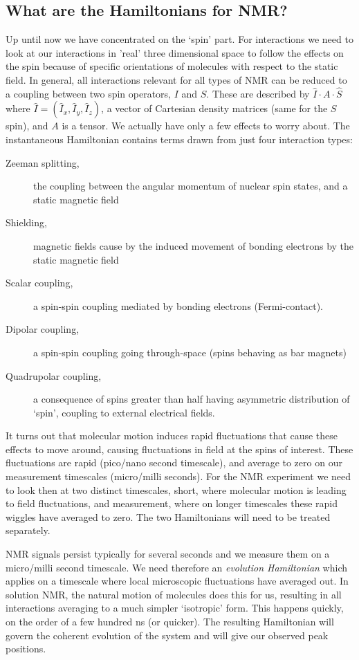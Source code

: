 \documentclass[notitlepage,11pt]{article}
\begin{document}
\subsection{What are the Hamiltonians for NMR?}

Up until now we have concentrated on the `spin' part. For interactions we need to look at our interactions in 'real' three dimensional space to follow the effects on the spin because of specific orientations of molecules with respect to the static field. In general, all interactions relevant for all types of NMR can be reduced to a coupling between two spin operators, $I$ and $S$. These are described by $\hat{I} \cdot A \cdot \hat{S}$ where $\hat{I}=(\hat{I}_x,\hat{I}_y,\hat{I}_z)$, a vector of Cartesian density matrices (same for the $S$ spin), and $A$ is a tensor. We actually have only a few effects to worry about. The instantaneous Hamiltonian contains terms drawn from just four interaction types:

\begin{description}
\item [Zeeman splitting,] the coupling between the angular momentum of nuclear spin states, and a static magnetic field
  \item [Shielding,] magnetic fields cause by the induced movement of bonding electrons by the static magnetic field
\item [Scalar coupling,] a spin-spin coupling mediated by bonding electrons (Fermi-contact).
\item [Dipolar coupling,] a spin-spin coupling going through-space (spins behaving as bar magnets)
  \item [Quadrupolar coupling,] a consequence of spins greater than half having asymmetric distribution of `spin', coupling to external electrical fields. 
  \end{description}

It turns out that molecular motion induces rapid fluctuations that cause these effects to move around, causing fluctuations in field at the spins of interest. These fluctuations are rapid (pico/nano second timescale), and average to zero on our measurement timescales (micro/milli seconds). For the NMR experiment we need to look then at two distinct timescales, short, where molecular motion is leading to field fluctuations, and measurement, where on longer timescales these rapid wiggles have averaged to zero. The two Hamiltonians will need to be treated separately.

NMR signals persist typically for several seconds and we measure them on a micro/milli second timescale. We need therefore an \emph{evolution Hamiltonian} which applies on a timescale where local microscopic fluctuations have averaged out. In solution NMR, the natural motion of molecules does this for us, resulting in all interactions averaging to a much simpler `isotropic' form. This happens quickly, on the order of a few hundred ns (or quicker). The resulting Hamiltonian will govern the coherent evolution of the system and will give our observed peak positions.
\end{document}
